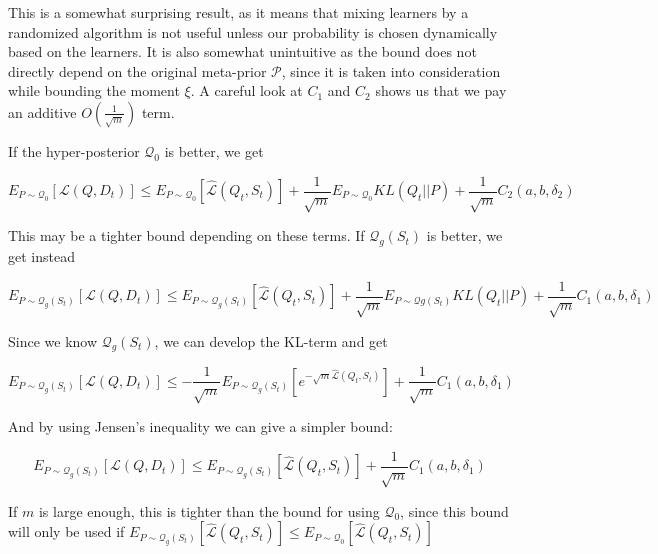 \documentclass[letterpaper]{article}
\theoremstyle{definition}
\begin{document}
This is a somewhat surprising result, as it means that mixing learners by a randomized algorithm is not useful unless our probability is chosen dynamically based on the learners. It is also somewhat unintuitive as the bound does not directly depend on the original meta-prior $\mathcal{P}$, since it is taken into consideration while bounding the moment $\xi$. A careful look at $C_1$ and $C_2$ shows us that we pay an additive $O(\frac{1}{\sqrt{m}})$ term.

If the hyper-posterior $\mathcal{Q}_0$ is better, we get 

$$ E_{P\sim \mathcal{Q}_0} \left [\mathcal{L}(Q, D_t)\right ] \leq   E_{P\sim \mathcal{Q}_0} \left [\hat{\mathcal{L}}(Q_t, S_t)\right ]  +
\frac{1}{\sqrt{m}} E_{P\sim \mathcal{Q}_0}KL(Q_t||P) + \frac{1}{\sqrt{m}}C_2(a,b,\delta_2)$$

This may be a tighter bound depending on these terms. If $\mathcal{Q}_{g}(S_t)$ is better, we get instead

$$ E_{P\sim \mathcal{Q}_{g}(S_t)} \left [\mathcal{L}(Q, D_t)\right ] \leq   E_{P\sim \mathcal{Q}_{g}(S_t)} \left [\hat{\mathcal{L}}(Q_t, S_t)\right ]  +
\frac{1}{\sqrt{m}} E_{P\sim \mathcal{Q}{g}(S_t)}KL(Q_t||P) + \frac{1}{\sqrt{m}}C_1(a,b,\delta_1)$$

Since we know $\mathcal{Q}_{g}(S_t)$, we can develop the KL-term and get

$$ E_{P\sim \mathcal{Q}_{g}(S_t)} \left[\mathcal{L}(Q, D_t)\right ] \leq -\frac{1}{\sqrt{m}}E_{P\sim \mathcal{Q}_{g}(S_t)} \left[ e^{-\sqrt{m}\hat{\mathcal{L}}(Q_t, S_t)}\right ] + \frac{1}{\sqrt{m}}C_1(a,b,\delta_1)$$

And by using Jensen's inequality we can give a simpler bound:

$$ E_{P\sim \mathcal{Q}_{g}(S_t)} \left[\mathcal{L}(Q, D_t)\right ] \leq E_{P\sim \mathcal{Q}_{g}(S_t)} \left[ \hat{\mathcal{L}}(Q_t, S_t)\right ] + \frac{1}{\sqrt{m}}C_1(a,b,\delta_1)$$

If $m$ is large enough, this is tighter than the bound for using $\mathcal{Q}_0$, since this bound will only be used if $E_{P\sim \mathcal{Q}_{g}(S_t)} \left[ \hat{\mathcal{L}}(Q_t, S_t)\right ]\leq E_{P\sim \mathcal{Q}_0} \left[ \hat{\mathcal{L}}(Q_t, S_t)\right ]$

\end{document}
